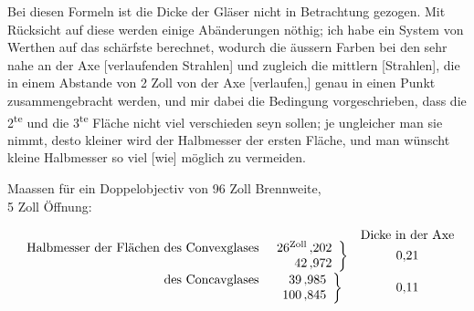 Bei diesen Formeln ist die Dicke der Gläser nicht in Betrachtung gezogen. Mit Rücksicht auf diese werden einige Abänderungen nöthig; ich habe ein System von Werthen auf das schärfste berechnet, wodurch die äussern Farben bei den sehr nahe an der Axe [verlaufenden Strahlen] und zugleich die mittlern [Strahlen], die in einem Abstande von 2 Zoll von der Axe [verlaufen,] genau in einen Punkt zusammengebracht werden, und mir dabei die Bedingung vorgeschrieben, dass die 2\textsuperscript{te} und die 3\textsuperscript{te} Fläche nicht viel verschieden seyn sollen; je ungleicher man sie nimmt, desto kleiner wird der Halbmesser der ersten Fläche, und man wünscht kleine Halbmesser so viel [wie] möglich zu vermeiden.
\clearpage{}
\begin{center}
Maassen für ein Doppelobjectiv von 96 Zoll Brennweite,\\
5 Zoll Öffnung:
\end{center}
\begingroup\small
\[
\begin{array}{r@{\;}c@{\quad}c}
&&\text{Dicke in der Axe}\\[-2pt]
\begin{array}{r}\text{Halbmesser der Flächen des Convexglases}\\\vphantom{42}\end{array}
&\left.\begin{array}{r@{\,}l}26^{\mathrm{Zoll}}&{,}202\\42&{,}972\end{array}\right\}&0{,}21\\[7pt]
\begin{array}{r}\text{des Concavglases}\\\vphantom{100}\end{array}
&\left.\begin{array}{r@{\,}l}39&{,}985\\100&{,}845\end{array}\right\}&0{,}11
\end{array}
\]\endgroup


